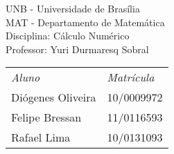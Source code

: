 \newpage
\begin{flushleft}
    {UNB - Universidade de Bras\'ilia\\}
    {MAT - Departamento de Matem\'atica\\}
    {Disciplina: C\'alculo Numérico\\}
    {Professor: Yuri Durmaresq Sobral\\}
\end{flushleft}
      \vspace{6.0cm}
      \begin{center}
      {\Huge \tituloCapa}
      \end{center}
      \vspace{8.0cm}
      
 \begin{tabular}{ll}
 \textit{Aluno} & \textit{Matr\'icula}\\
 Di\'ogenes Oliveira & 10/0009972\\
 Felipe Bressan & 11/0116593\\
 Rafael Lima & 10/0131093\\
 \end{tabular}

\newpage
